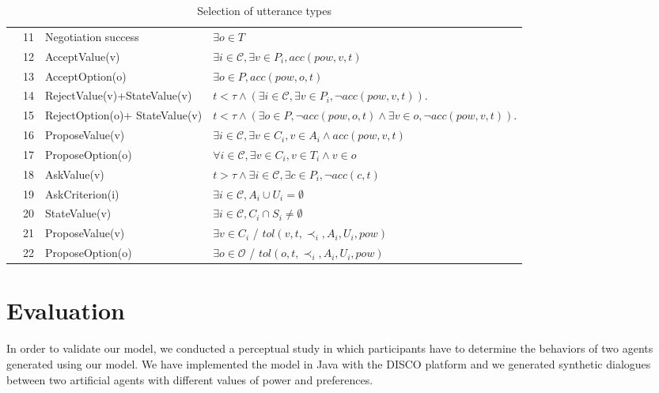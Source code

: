 \documentclass{llncs}
\begin{document}
\begin{table}[!t]
{\begin{tabular}{|p{.3cm}|p{.6cm}|p{3cm}|p{7.5cm}|}
	\parbox[t]{2mm}{
		} & 11& Negotiation success &  $\exists o \in T$ \\
	&12& AcceptValue(v) & $\exists i\in\mathcal{C}, \exists v \in P_i, acc(pow, v, t)$ \\
	&13&AcceptOption(o) & $\exists o \in P, acc(pow, o, t)$ \\
	&14&RejectValue(v)+\newline StateValue(v) & $ t<\tau \land (\exists i\in\mathcal{C}, \exists v \in P_i, \neg acc(pow,v, t))$.\\
	&15&RejectOption(o)+ \newline StateValue(v) & $ t<\tau \land (\exists o \in P,  \neg acc(pow,o, t) \land \exists v \in o, \neg acc(pow,v, t))$.\\
	&16&ProposeValue(v) &  $\exists i\in\mathcal{C}, \exists v \in C_i, v \in A_i  \land acc(pow, v, t) $\\
	&17&ProposeOption(o)  & $\forall i\in\mathcal{C},\exists v \in C_i, v \in T_i  \land v \in o$ \\
	&18&AskValue(v) & $t > \tau \land \exists i\in\mathcal{C}, \exists c \in P_i, \neg acc(c, t)$ \\
	&19&AskCriterion(i) & $\exists i\in\mathcal{C}, A_i \cup U_i= \emptyset $\\
	&20&StateValue(v) & $\exists i\in\mathcal{C}, C_i\cap S_i \neq \emptyset$	\\
	&21& ProposeValue(v) & $\exists v \in C_i$ / $tol(v, t, \prec_i, A_i, U_i, pow)$\\
	&22& ProposeOption(o) & $\exists o \in \mathcal{O}$ / $tol(o, t, \prec_i, A_i, U_i, pow)$\\
	
	\hline
	\end{tabular}
	}
	\caption{Selection of utterance types}
	\label{utt}
	\end{table}
	
	\section{Evaluation}
	\label{sec:evaluation}
	
	In order to validate our model, we conducted a perceptual study in which participants have to determine the behaviors of two agents generated using our model. We have implemented the model in Java with the DISCO platform \cite{rich09} and we generated synthetic dialogues between two artificial agents with different values of power and preferences.
\end{document}
